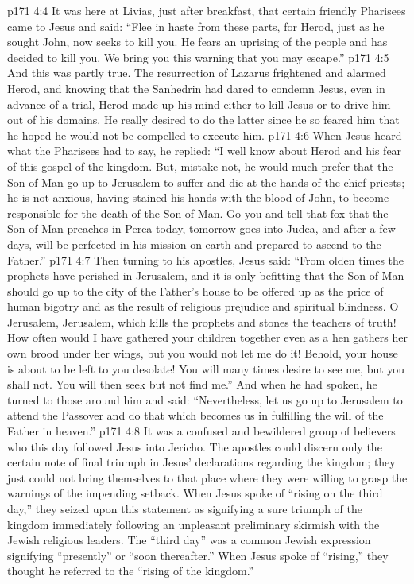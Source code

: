 \vs p171 4:4 \pc It was here at Livias, just after breakfast, that certain friendly Pharisees came to Jesus and said: “Flee in haste from these parts, for Herod, just as he sought John, now seeks to kill you. He fears an uprising of the people and has decided to kill you. We bring you this warning that you may escape.”
\vs p171 4:5 And this was partly true. The resurrection of Lazarus frightened and alarmed Herod, and knowing that the Sanhedrin had dared to condemn Jesus, even in advance of a trial, Herod made up his mind either to kill Jesus or to drive him out of his domains. He really desired to do the latter since he so feared him that he hoped he would not be compelled to execute him.
\vs p171 4:6 When Jesus heard what the Pharisees had to say, he replied: \textcolor{ubdarkred}{“I well know about Herod and his fear of this gospel of the kingdom. But, mistake not, he would much prefer that the Son of Man go up to Jerusalem to suffer and die at the hands of the chief priests; he is not anxious, having stained his hands with the blood of John, to become responsible for the death of the Son of Man. Go you and tell that fox that the Son of Man preaches in Perea today, tomorrow goes into Judea, and after a few days, will be perfected in his mission on earth and prepared to ascend to the Father.”}
\vs p171 4:7 Then turning to his apostles, Jesus said: \textcolor{ubdarkred}{“From olden times the prophets have perished in Jerusalem, and it is only befitting that the Son of Man should go up to the city of the Father’s house to be offered up as the price of human bigotry and as the result of religious prejudice and spiritual blindness. O Jerusalem, Jerusalem, which kills the prophets and stones the teachers of truth! How often would I have gathered your children together even as a hen gathers her own brood under her wings, but you would not let me do it! Behold, your house is about to be left to you desolate! You will many times desire to see me, but you shall not. You will then seek but not find me.”} And when he had spoken, he turned to those around him and said: \textcolor{ubdarkred}{“Nevertheless, let us go up to Jerusalem to attend the Passover and do that which becomes us in fulfilling the will of the Father in heaven.”}
\vs p171 4:8 \pc It was a confused and bewildered group of believers who this day followed Jesus into Jericho. The apostles could discern only the certain note of final triumph in Jesus’ declarations regarding the kingdom; they just could not bring themselves to that place where they were willing to grasp the warnings of the impending setback. When Jesus spoke of \textcolor{ubdarkred}{“rising on the third day,”} they seized upon this statement as signifying a sure triumph of the kingdom immediately following an unpleasant preliminary skirmish with the Jewish religious leaders. The “third day” was a common Jewish expression signifying “presently” or “soon thereafter.” When Jesus spoke of \textcolor{ubdarkred}{“rising,”} they thought he referred to the “rising of the kingdom.”
